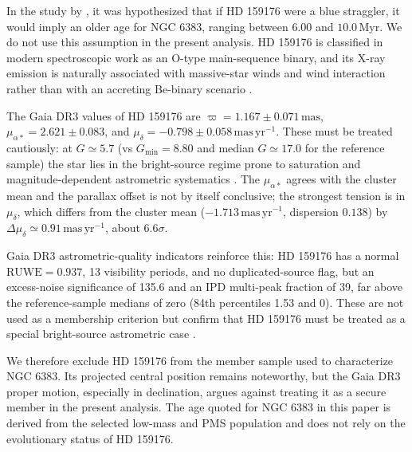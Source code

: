 \documentclass{aa}
\begin{document}
In the study by \citet{2018AA...610A..30A}, it was hypothesized that if HD 159176 were a blue straggler, it would imply an older age for NGC 6383, ranging between $6.00$ and $10.0$\,Myr. We do not use this assumption in the present analysis. HD 159176 is classified in modern spectroscopic work as an O-type main-sequence binary, and its X-ray emission is naturally associated with massive-star winds and wind interaction rather than with an accreting Be-binary scenario \citep{2003AA...407..925R,1993Obs...113..204S,2007A&A...474..193L,2016ApJ...832..211P}.

The Gaia DR3 values of HD 159176 are $\varpi = 1.167 \pm 0.071\,\mathrm{mas}$, $\mu_{\alpha*}=2.621 \pm 0.083$, and $\mu_{\delta}=-0.798 \pm 0.058\,\mathrm{mas\,yr^{-1}}$. These must be treated cautiously: at $G\simeq5.7$ (vs $G_{\min}=8.80$ and median $G\simeq17.0$ for the reference sample) the star lies in the bright-source regime prone to saturation and magnitude-dependent astrometric systematics \citep{2021A&A...649A...2L,2021A&A...649A...4L,2021A&A...649A.124C,2022A&A...657A.130M}. The $\mu_{\alpha*}$ agrees with the cluster mean and the parallax offset is not by itself conclusive; the strongest tension is in $\mu_{\delta}$, which differs from the cluster mean ($-1.713\,\mathrm{mas\,yr^{-1}}$, dispersion $0.138$) by $\Delta\mu_{\delta}\simeq0.91\,\mathrm{mas\,yr^{-1}}$, about $6.6\sigma$.

Gaia DR3 astrometric-quality indicators reinforce this: HD 159176 has a normal $\mathrm{RUWE}=0.937$, 13 visibility periods, and no duplicated-source flag, but an excess-noise significance of 135.6 and an IPD multi-peak fraction of 39, far above the reference-sample medians of zero (84th percentiles 1.53 and 0). These are not used as a membership criterion but confirm that HD 159176 must be treated as a special bright-source astrometric case \citep{2022MNRAS.510.2597R}.

We therefore exclude HD 159176 from the member sample used to characterize NGC 6383. Its projected central position remains noteworthy, but the Gaia DR3 proper motion, especially in declination, argues against treating it as a secure member in the present analysis. The age quoted for NGC 6383 in this paper is derived from the selected low-mass and PMS population and does not rely on the evolutionary status of HD 159176.
\end{document}
